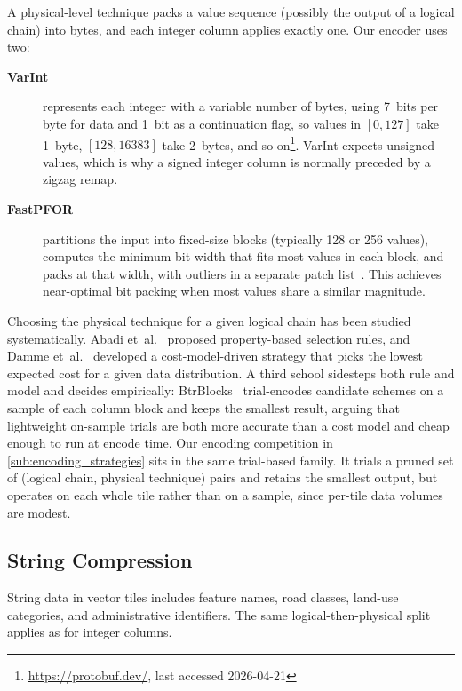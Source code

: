 A physical-level technique packs a value sequence (possibly the output of a logical chain) into bytes, and each integer column applies exactly one.
Our encoder uses two:

\begin{description}
    \item[\textbf{\acf{VarInt}}] represents each integer with a variable number of bytes, using 7~bits per byte for data and 1~bit as a continuation flag, so values in $[0, 127]$ take 1~byte, $[128, 16383]$ take 2~bytes, and so on\footnote{\url{https://protobuf.dev/}, last accessed 2026-04-21}.
    VarInt expects unsigned values, which is why a signed integer column is normally preceded by a zigzag remap.

    \item[\textbf{\acf{FastPFOR}}] partitions the input into fixed-size blocks (typically 128 or 256 values), computes the minimum bit width that fits most values in each block, and packs at that width, with outliers in a separate patch list~\cite{lemireDecodingBillionsIntegers2015}.
    This achieves near-optimal bit packing when most values share a similar magnitude.
\end{description}

Choosing the physical technique for a given logical chain has been studied systematically.
Abadi et~al.~\cite{abadiIntegratingCompressionExecution2006} proposed property-based selection rules, and Damme et~al.~\cite{dammeComprehensiveExperimentalSurvey2019} developed a cost-model-driven strategy that picks the lowest expected cost for a given data distribution.
A third school sidesteps both rule and model and decides empirically: BtrBlocks~\cite{kuschewskiBtrBlocksEfficientColumnar2023} trial-encodes candidate schemes on a sample of each column block and keeps the smallest result, arguing that lightweight on-sample trials are both more accurate than a cost model and cheap enough to run at encode time.
Our encoding competition in \cref{sub:encoding_strategies} sits in the same trial-based family.
It trials a pruned set of (logical chain, physical technique) pairs and retains the smallest output, but operates on each whole tile rather than on a sample, since per-tile data volumes are modest.

\subsection{String Compression}\label{sub:string_compression}

String data in vector tiles includes feature names, road classes, land-use categories, and administrative identifiers.
The same logical-then-physical split applies as for integer columns.

